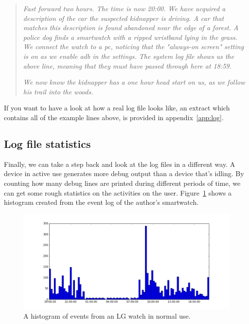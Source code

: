 \documentclass[a4paper,11pt,dvips]{article}
\begin{document}
\begin{quote}
\textit{Fast forward two hours. The time is now 20:00. We have acquired a description of the car the suspected kidnapper is driving. A car that matches this description is found abandoned near the edge of a forest. A police dog finds a smartwatch with a ripped wristband lying in the grass. We connect the watch to a pc, noticing that the "always-on screen" setting is on as we enable adb in the settings. The system log file shows us the above line, meaning that they must have passed through here at 18:59.}

\textit{We now know the kidnapper has a one hour head start on us, as we follow his trail into the woods.}
\end{quote}

\noindent
If you want to have a look at how a real log file looks like, an extract which contains all of the example lines above, is provided in appendix~\ref{app:log}.


\subsection{Log file statistics}

Finally, we can take a step back and look at the log files in a different way. A device in active use generates more debug output than a device that's idling. By counting how many debug lines are printed during different periods of time, we can get some rough statistics on the activities on the user. Figure~\ref{fig:eventlog} shows a histogram created from the event log of the author's smartwatch.

\begin{figure}
\noindent
\includegraphics[natwidth=1301bp,natheight=600bp,width=\linewidth]{eventlog}
\caption{A histogram of events from an LG watch in normal use.}
\label{fig:eventlog}
\end{figure}
\end{document}
